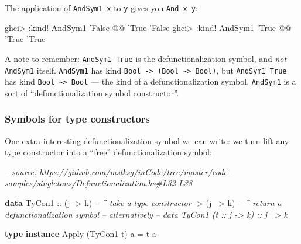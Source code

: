 \documentclass[]{article}
\newenvironment{Shaded}{}{}
\newcommand{\CommentTok}[1]{\textcolor[rgb]{0.38,0.63,0.69}{\textit{#1}}}
\newcommand{\DataTypeTok}[1]{\textcolor[rgb]{0.56,0.13,0.00}{#1}}
\newcommand{\FunctionTok}[1]{\textcolor[rgb]{0.02,0.16,0.49}{#1}}
\newcommand{\KeywordTok}[1]{\textcolor[rgb]{0.00,0.44,0.13}{\textbf{#1}}}
\newcommand{\NormalTok}[1]{#1}
\newcommand{\OtherTok}[1]{\textcolor[rgb]{0.00,0.44,0.13}{#1}}
\begin{document}
The application of \texttt{AndSym1\ x} to \texttt{y} gives you
\texttt{And\ x\ y}:

\begin{Shaded}
\begin{Highlighting}[]
\NormalTok{ghci}\FunctionTok{>} \FunctionTok{:}\NormalTok{kind}\FunctionTok{!} \DataTypeTok{AndSym1}\NormalTok{ '}\DataTypeTok{False} \FunctionTok{@@}\NormalTok{ '}\DataTypeTok{True}
\NormalTok{'}\DataTypeTok{False}
\NormalTok{ghci}\FunctionTok{>} \FunctionTok{:}\NormalTok{kind}\FunctionTok{!} \DataTypeTok{AndSym1}\NormalTok{ '}\DataTypeTok{True}  \FunctionTok{@@}\NormalTok{ '}\DataTypeTok{True}
\NormalTok{'}\DataTypeTok{True}
\end{Highlighting}
\end{Shaded}

A note to remember: \texttt{AndSym1\ \textquotesingle{}True} is the
defunctionalization symbol, and \emph{not} \texttt{AndSym1} itself.
\texttt{AndSym1} has kind
\texttt{Bool\ -\textgreater{}\ (Bool\ \textasciitilde{}\textgreater{}\ Bool)},
but \texttt{AndSym1\ \textquotesingle{}True} has kind
\texttt{Bool\ \textasciitilde{}\textgreater{}\ Bool} --- the kind of a
defunctionalization symbol. \texttt{AndSym1} is a sort of ``defunctionalization
symbol constructor''.

\hypertarget{symbols-for-type-constructors}{%
\subsubsection{Symbols for type
constructors}\label{symbols-for-type-constructors}}

One extra interesting defunctionalization symbol we can write: we turn lift any
type constructor into a ``free'' defunctionalization symbol:

\begin{Shaded}
\begin{Highlighting}[]
\CommentTok{-- source: https://github.com/mstksg/inCode/tree/master/code-samples/singletons/Defunctionalization.hs#L32-L38}

\KeywordTok{data} \DataTypeTok{TyCon1}
\OtherTok{        ::}\NormalTok{ (j }\OtherTok{->}\NormalTok{ k)     }\CommentTok{-- ^ take a type constructor}
        \OtherTok{->}\NormalTok{ (j }\FunctionTok{~>}\NormalTok{ k)     }\CommentTok{-- ^ return a defunctionalization symbol}
\CommentTok{-- alternatively}
\CommentTok{-- data TyCon1 (t :: j -> k) :: j ~> k}

\KeywordTok{type} \KeywordTok{instance} \DataTypeTok{Apply}\NormalTok{ (}\DataTypeTok{TyCon1}\NormalTok{ t) a }\FunctionTok{=}\NormalTok{ t a}
\end{Highlighting}
\end{Shaded}
\end{document}

